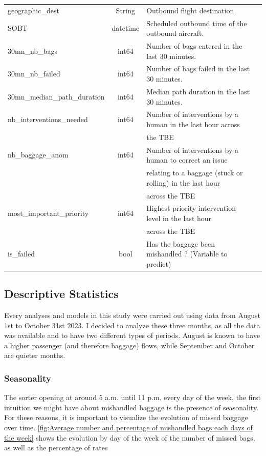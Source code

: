 \documentclass[12pt]{article}
\begin{document}
\begin{table}[ht]
\begin{tabularx}{\textwidth}{lclX}
        geographic\_dest & String & Outbound flight destination. \\
        SOBT & datetime & Scheduled outbound time of the outbound aircraft. \\
        30mn\_nb\_bags & int64 & Number of bags entered in the last 30 minutes. \\
        30mn\_nb\_failed & int64 & Number of bags failed in the last 30 minutes. \\
        30mn\_median\_path\_duration & int64 & Median path duration in the last 30 minutes. \\
        nb\_interventions\_needed & int64 & Number of interventions by a human in the last hour across \\ && the TBE \\
        nb\_baggage\_anom & int64 & Number of interventions by a human to correct an issue \\ &&relating to a baggage (stuck or rolling) in the last hour \\ && across the TBE \\
        most\_important\_priority & int64 & Highest priority intervention level in the last hour \\ && across the TBE \\
        is\_failed & bool & Has the baggage been mishandled ? (Variable to predict) \\
        
        \bottomrule
    \end{tabularx}
\end{table}
\FloatBarrier

\newpage
\subsection{Descriptive Statistics}
Every analyses and models in this study were carried out using data from August 1st to October 31st 2023. I decided to analyze these three months, as all the data was available and to have two different types of periods. August is known to have a higher passenger (and therefore baggage) flows, while September and October are quieter months.

\subsubsection{Seasonality}
The sorter opening at around 5 a.m. until 11 p.m. every day of the week, the first intuition we might have about mishandled baggage is the presence of seasonality.
For these reasons, it is important to visualize the evolution of missed baggage over time. \autoref{fig:Average number and percentage of mishandled bags each days of the week}
shows the evolution by day of the week of the number of missed bags, as well as the percentage of
rates
\end{document}
